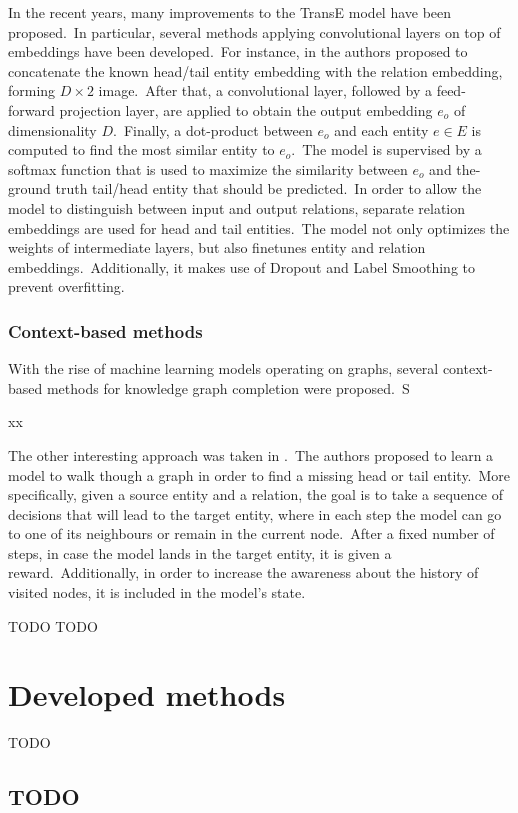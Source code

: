 \documentclass[longabstract, english, mgr]{iithesis}
\newcommand\numberedchapter[1]{\setlength\topskip{3cm}\chapter{#1}\setlength\topskip{0cm}}
\theoremstyle{default_theorem_style}\newtheorem{theorem}{Theorem}
\theoremstyle{default_theorem_style}\newtheorem{definition}{Definition}
\begin{document}
\noindent In the recent years, many improvements to the TransE model have been proposed.\ In particular, several
methods applying convolutional layers on top of embeddings have been developed.\ For instance, in \cite{conve_model} the
authors proposed to concatenate the known head/tail entity embedding with the relation embedding, forming
$D \times 2$ image.\ After that, a convolutional layer, followed by a feed-forward projection layer, are applied to
obtain the output embedding $e_o$ of dimensionality $D$.\ Finally, a dot-product between $e_o$ and each entity
$e \in E$ is computed to find the most similar entity to $e_o$.\ The model is supervised by a softmax function that
is used to maximize the similarity between $e_o$ and the-ground truth tail/head entity that should be
predicted.\ In order to allow the model to distinguish between input and output relations, separate
relation embeddings are used for head and tail entities.\ The model not only optimizes the weights of intermediate
layers, but also finetunes entity and relation embeddings.\ Additionally, it makes use of Dropout and Label
Smoothing to prevent overfitting.

\subsection{Context-based methods}

With the rise of machine learning models operating on graphs, several context-based methods for knowledge graph
completion were proposed.\ S

xx\newline

\noindent The other interesting approach was taken in \cite{go_for_a_walk_model}.\ The authors proposed to learn a
model to walk though a graph in order to find a missing head or tail entity.\ More specifically, given a source entity
and a relation, the goal is to take a sequence of decisions that will lead to the target entity, where in
each step the model can go to one of its neighbours or remain in the current node.\ After a fixed number of steps,
in case the model lands in the target entity, it is given a reward.\ Additionally, in order to increase the awareness
about the history of visited nodes, it is included in the model's state.

TODO \cite{gcn_model}
TODO \cite{comp_gcn_model}

\numberedchapter{Developed methods}

TODO

\section{TODO}
\end{document}
